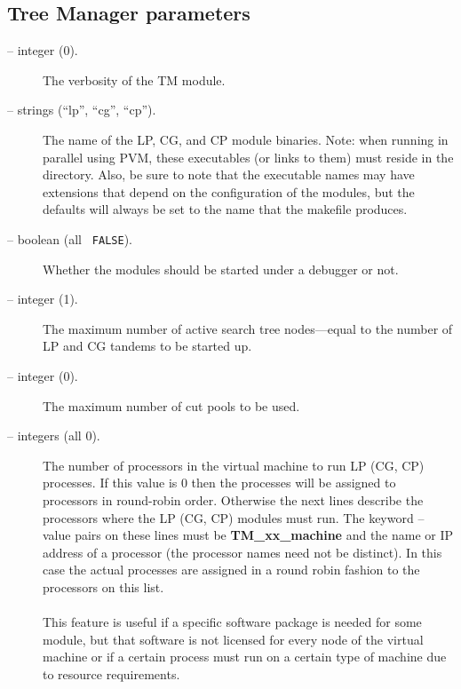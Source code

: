 \subsection{Tree Manager parameters}
\label{tm_params}
\begin{description}

\item[ -- integer (0).] 
The verbosity of the TM module.

\item[ -- strings (``lp'', ``cg'',
``cp'').] 
The name of the LP, CG, and CP module binaries. Note: when running in
parallel using PVM, these executables (or links to them) must reside
in the  directory. Also, be sure to note
that the executable names may have extensions that depend on the
configuration of the modules, but the defaults will always be set to
the name that the makefile produces.

\item[ -- boolean (all {\tt
FALSE}).] 
Whether the modules should be started under a debugger or not.

\item[ -- integer (1).] 
The maximum number of active search tree nodes---equal to the number of
LP and CG tandems to be started up.

\item[ -- integer (0).] 
The maximum number of cut pools to be used.

\item[ -- integers
(all 0).] 
The number of processors in the virtual machine to run LP (CG, CP)
processes. If this value is 0 then the processes will be assigned to
processors in round-robin order. Otherwise the next  lines
describe the processors where the LP (CG, CP) modules must run. The
keyword -- value pairs on these lines must be {\bf TM\_xx\_machine} and the
name or IP address of a processor (the processor names need not be distinct).
In this case the actual processes are assigned in a round robin fashion to the
processors on this list.\\
\\
This feature is useful if a specific software package is needed for
some module, but that software is not licensed for every node of the
virtual machine or if a certain process must run on a certain type of
machine due to resource requirements.


\end{description}
